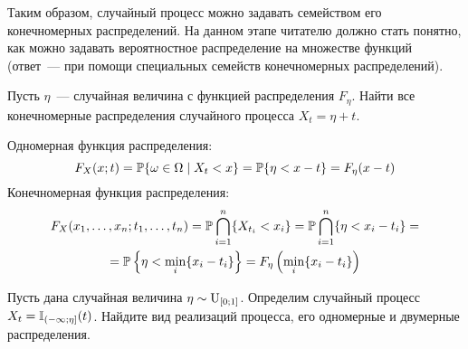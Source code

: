 Таким образом, случайный процесс можно задавать семейством его конечномерных распределений.
На данном этапе читателю должно стать понятно,
как можно задавать вероятностное распределение на множестве функций
(ответ~--- при помощи специальных семейств конечномерных распределений).

\begin{exercise}
    \label{exercise:basics:rv_plus_t}
    Пусть $ \eta $~--- случайная величина с функцией распределения $ F_\eta $.
    Найти все конечномерные распределения случайного процесса $ X_t = \eta + t $.
\end{exercise}

\begin{solution}
    Одномерная функция распределения:
    \[
        F_X(x; t) = \mathbb{P} \{ \omega \in \Omega \mid X_t < x \} = \mathbb{P} \{ \eta < x - t \} = F_\eta(x - t)
    \]
    Конечномерная функция распределения:
    \begin{multline*}
        F_X(x_1, \ldots, x_n; t_1, \ldots, t_n) = \mathbb{P} \bigcap_{i = 1}^n \{ X_{t_i} < x_i \} = \mathbb{P} \bigcap_{i = 1}^n \{ \eta < x_i - t_i \} = \\
        = \mathbb{P} \left\{ \eta < \min_i \{x_i - t_i\} \right\} = F_\eta \left(\min_i \{x_i - t_i \} \right)
    \end{multline*}
\end{solution}

\begin{exercise}
    \label{exercise:basics:random_point_om_segment}
    Пусть дана случайная величина $ \eta \sim \textnormal{U}_{[0;1]} $.
    Определим случайный процесс $ X_t = \mathbb{I}_{(-\infty; \eta]}(t) $.
    Найдите вид реализаций процесса, его одномерные и двумерные распределения.
\end{exercise}

